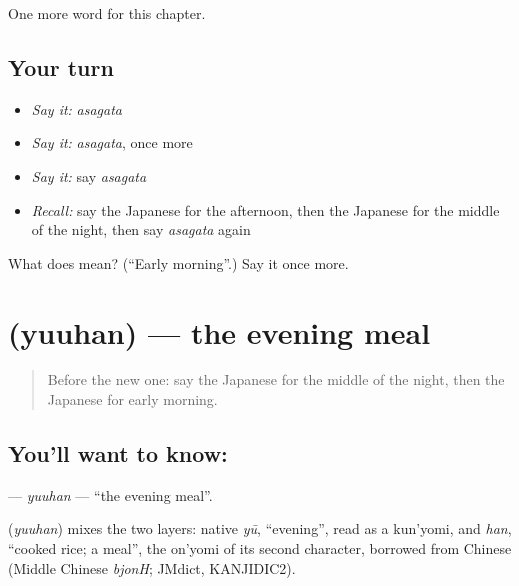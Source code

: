 \begin{grammarlens}[title={What you've built}]
One more word for this chapter.
\end{grammarlens}

\subsection*{Your turn}
\begin{itemize}
\raggedright
  \item \emph{Say it:} \emph{asagata}
  \item \emph{Say it:} \emph{asagata}, once more
  \item \emph{Say it:} say \emph{asagata}
  \item \emph{Recall:} say the Japanese for the afternoon, then the Japanese for the middle of the night, then say \emph{asagata} again
\end{itemize}

\begin{tcolorbox}[breakable,colback=teal!4,colframe=teal!35!black,title={Before you move on}]
What does  mean? (\textquotedblleft{}Early morning\textquotedblright{}.) Say it once more.
\end{tcolorbox}
\section[\texorpdfstring{\ja{ゆうはん} (yuuhan)}{ゆうはん (yuuhan)}]{ (yuuhan) — the evening meal}

\label{lesson:JA-C72-yuuhan}



\begin{quote}
Before the new one: say the Japanese for the middle of the night, then the Japanese for early morning.
\end{quote}

\subsection*{You'll want to know: }
\textbf{} — \emph{yuuhan} — \textquotedblleft{}the evening meal\textquotedblright{}.

\begin{cousinweb}
\textbf{} (\emph{yuuhan}) mixes the two layers: native \emph{yū}, \textquotedblleft{}evening\textquotedblright{}, read as a kun'yomi, and \emph{han}, \textquotedblleft{}cooked rice; a meal\textquotedblright{}, the on'yomi of its second character, borrowed from Chinese (Middle Chinese \emph{bjonH}; JMdict, KANJIDIC2).
\end{cousinweb}


